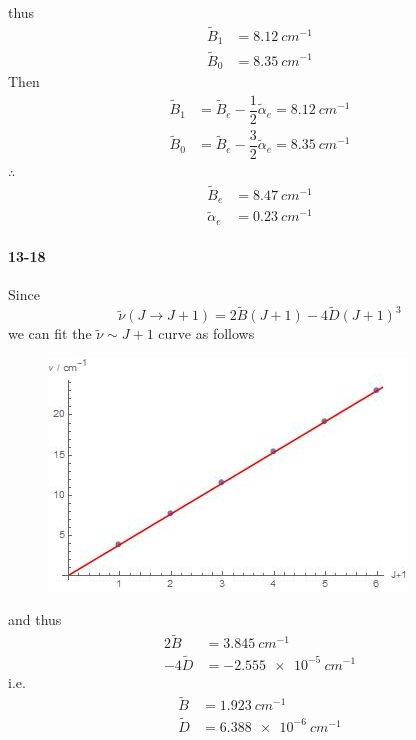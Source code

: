 \documentclass[a4paper]{article}
\DeclareMathOperator{\ra}{\rightarrow}
\newcommand{\ex}[1]{\paragraph{13-#1}}
\numberwithin{equation}{section}
\begin{document}
thus
\begin{align}
\tilde{B}_1 &= \SI{8.12}{cm^{-1}}\\
\tilde{B}_0 &= \SI{8.35}{cm^{-1}}
\end{align}
Then
\begin{align}
\tilde{B}_1 &= \tilde{B}_e - \dfrac{1}{2}\tilde{\alpha}_e = \SI{8.12}{cm^{-1}}\\
\tilde{B}_0 &= \tilde{B}_e - \dfrac{3}{2}\tilde{\alpha}_e = \SI{8.35}{cm^{-1}}
\end{align}
$ \therefore $
\begin{align}
\tilde{B}_e &= \SI{8.47}{cm^{-1}}\\
\tilde{\alpha}_e &= \SI{0.23}{cm^{-1}}
\end{align}
\ex{18}
Since
\begin{equation}\label{key}
\tilde{\nu}(J\ra J+1) = 2\tilde{B}(J+1) - 4\tilde{D}(J+1)^3
\end{equation}
we can fit the $ \tilde{\nu}\sim J+1 $ curve as follows
\begin{figure}[H]
	\centering
	\includegraphics[width=0.5\linewidth]{chap13-18.jpg}
\end{figure}
and thus
\begin{align}
2\tilde{B} &= \SI{3.845}{cm^{-1}}\\
-4\tilde{D} &= \SI{-2.555e-5}{cm^{-1}}
\end{align}
i.e.
\begin{align}
\tilde{B} &= \SI{1.923}{cm^{-1}}\\
\tilde{D} &= \SI{6.388e-6}{cm^{-1}}
\end{align}
\end{document}
